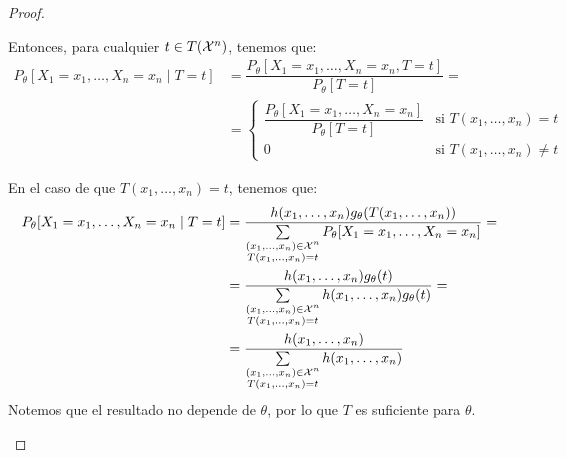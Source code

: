 \begin{teo}
\begin{proof}
\begin{description}
        Entonces, para cualquier $t\in T(\mathcal{X}^n)$, tenemos que:
        \begin{align*}
            P_\theta[X_1=x_1, \ldots, X_n=x_n\mid T=t] &= \dfrac{P_\theta[X_1=x_1, \ldots, X_n=x_n, T=t]}{P_\theta[T=t]} =\\&= \begin{cases}
                \dfrac{P_\theta[X_1=x_1, \ldots, X_n=x_n]}{P_\theta[T=t]} & \text{si } T(x_1, \ldots, x_n)=t \\
                0 & \text{si } T(x_1, \ldots, x_n)\neq t
            \end{cases}
        \end{align*}

        En el caso de que $T(x_1, \ldots, x_n)=t$, tenemos que:
        \begin{align*}
            P_\theta[X_1=x_1, \ldots, X_n=x_n\mid T=t] &= \dfrac{h(x_1, \ldots, x_n) g_\theta(T(x_1, \ldots, x_n))}{\sum\limits_{\substack{(x_1, \ldots, x_n)\in\mathcal{X}^n \\ T(x_1, \ldots, x_n)=t}} P_\theta[X_1=x_1, \ldots, X_n=x_n]} =\\&= \dfrac{h(x_1, \ldots, x_n) g_\theta(t)}{\sum\limits_{\substack{(x_1, \ldots, x_n)\in\mathcal{X}^n \\ T(x_1, \ldots, x_n)=t}} h(x_1, \ldots, x_n) g_\theta(t)} =\\&= \dfrac{h(x_1, \ldots, x_n)}{\sum\limits_{\substack{(x_1, \ldots, x_n)\in\mathcal{X}^n \\ T(x_1, \ldots, x_n)=t}} h(x_1, \ldots, x_n)}
        \end{align*}
        Notemos que el resultado no depende de $\theta$, por lo que $T$ es suficiente para $\theta$.\qedhere
    \end{description}
    \end{proof}
\end{teo}

